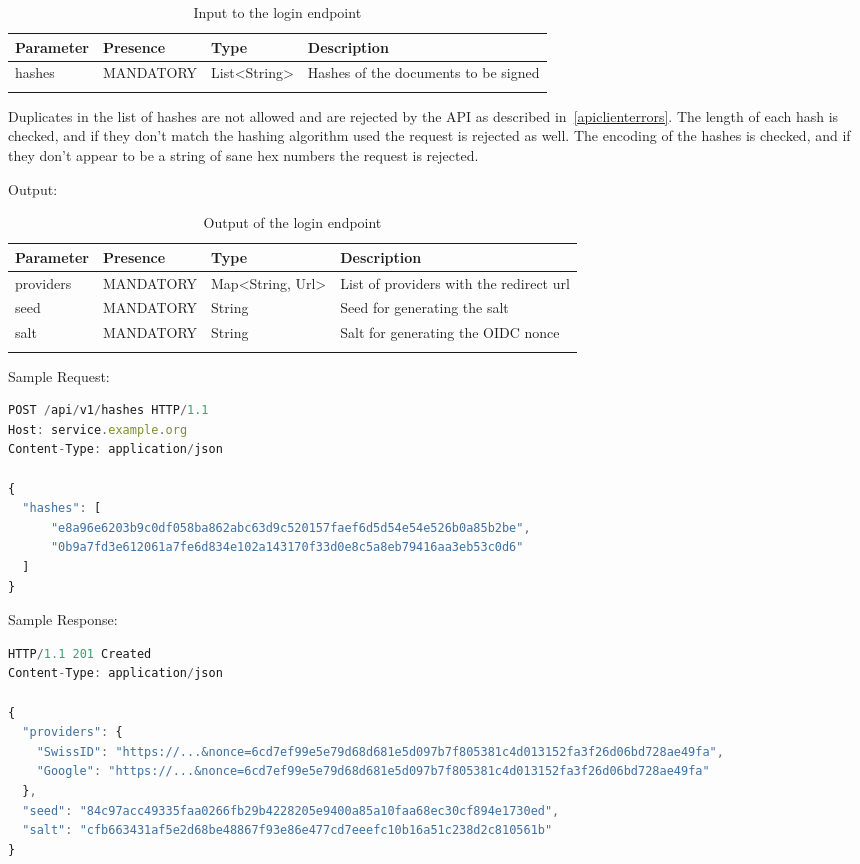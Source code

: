 \begin{longtable}{|l|l|l|l|}
	\hline
	\textbf{Parameter} & \textbf{Presence} & \textbf{Type} & \textbf{Description} \\ \hline
	hashes & MANDATORY & List<String> & Hashes of the documents to be signed \\ \hline
    \caption{Input to the login endpoint}
\end{longtable}

Duplicates in the list of hashes are not allowed and are rejected by the API as described in~\ref{apiclienterrors}.
The length of each hash is checked, and if they don't match the hashing algorithm used the request is rejected as well.
The encoding of the hashes is checked, and if they don't appear to be a string of sane hex numbers the request is rejected.

Output:

\begin{longtable}{|l|l|l|l|}
	\hline
	\textbf{Parameter} & \textbf{Presence} & \textbf{Type} & \textbf{Description} \\ \hline
	providers & MANDATORY & Map<String, Url> & List of providers with the redirect url \\ \hline
	seed & MANDATORY & String & Seed for generating the salt \\ \hline
	salt & MANDATORY & String & Salt for generating the OIDC nonce \\ \hline
	\caption{Output of the login endpoint}
\end{longtable}

Sample Request:
\begin{lstlisting}[caption={login request}, captionpos=b, language=JavaScript, label={lst:hashesrequest}]
POST /api/v1/hashes HTTP/1.1
Host: service.example.org
Content-Type: application/json

{
  "hashes": [
	  "e8a96e6203b9c0df058ba862abc63d9c520157faef6d5d54e54e526b0a85b2be",
	  "0b9a7fd3e612061a7fe6d834e102a143170f33d0e8c5a8eb79416aa3eb53c0d6"
  ]
}
\end{lstlisting}

Sample Response:
\begin{lstlisting}[caption={login response}, captionpos=b, language=JavaScript, label={lst:hashesresponse}]
HTTP/1.1 201 Created
Content-Type: application/json

{
  "providers": {
  	"SwissID": "https://...&nonce=6cd7ef99e5e79d68d681e5d097b7f805381c4d013152fa3f26d06bd728ae49fa",
	"Google": "https://...&nonce=6cd7ef99e5e79d68d681e5d097b7f805381c4d013152fa3f26d06bd728ae49fa"
  },
  "seed": "84c97acc49335faa0266fb29b4228205e9400a85a10faa68ec30cf894e1730ed",
  "salt": "cfb663431af5e2d68be48867f93e86e477cd7eeefc10b16a51c238d2c810561b"
}
\end{lstlisting}

